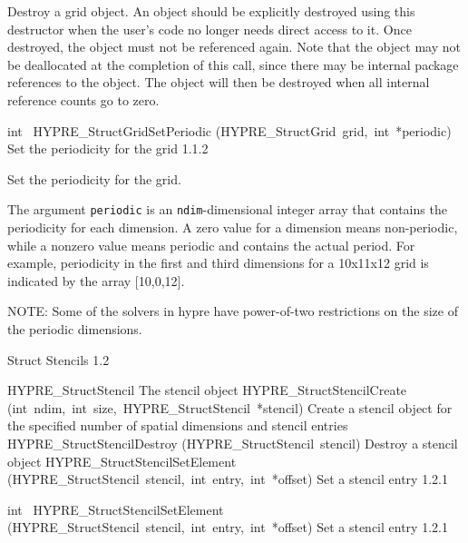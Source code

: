 \documentclass{article}
\begin{document}
\begin{cxxentry}
\begin{cxxentry}
\begin{cxxfunction}
\begin{cxxdoc}
Destroy a grid object.  An object should be explicitly destroyed using this
destructor when the user's code no longer needs direct access to it.  Once
destroyed, the object must not be referenced again.  Note that the object may
not be deallocated at the completion of this call, since there may be
internal package references to the object.  The object will then be destroyed
when all internal reference counts go to zero.
\end{cxxdoc}
\end{cxxfunction}
\begin{cxxfunction}
{int\ }
        {HYPRE\_StructGridSetPeriodic}
        {(HYPRE\_StructGrid\ grid,\ int\ *periodic)}
        {
Set the periodicity for the grid}
        {1.1.2}
\begin{cxxdoc}

Set the periodicity for the grid.

The argument {\tt periodic} is an {\tt ndim}-dimensional integer array that
contains the periodicity for each dimension.  A zero value for a dimension
means non-periodic, while a nonzero value means periodic and contains the
actual period.  For example, periodicity in the first and third dimensions
for a 10x11x12 grid is indicated by the array [10,0,12].

NOTE: Some of the solvers in hypre have power-of-two restrictions on the size
of the periodic dimensions.
\end{cxxdoc}
\end{cxxfunction}
\end{cxxentry}
\begin{cxxentry}
{}
        {Struct Stencils}
        {}
        {
}
        {1.2}
\begin{cxxnames}
        {HYPRE\_StructStencil}
        {}
        {
The stencil object}
        {}
\label{cxx.1.2.2}
        {HYPRE\_StructStencilCreate}
        {(int\ ndim,\ int\ size,\ HYPRE\_StructStencil\ *stencil)}
        {
Create a stencil object for the specified number of spatial dimensions and
stencil entries}
        {}
\label{cxx.1.2.3}
        {HYPRE\_StructStencilDestroy}
        {(HYPRE\_StructStencil\ stencil)}
        {
Destroy a stencil object}
        {}
\label{cxx.1.2.4}
        {HYPRE\_StructStencilSetElement}
        {(HYPRE\_StructStencil\ stencil,\ int\ entry,\ int\ *offset)}
        {
Set a stencil entry}
        {1.2.1}
\end{cxxnames}
\begin{cxxfunction}
{int\ }
        {HYPRE\_StructStencilSetElement}
        {(HYPRE\_StructStencil\ stencil,\ int\ entry,\ int\ *offset)}
        {
Set a stencil entry}
        {1.2.1}
\begin{cxxdoc}


\end{cxxdoc}
\end{cxxfunction}
\end{cxxentry}
\end{cxxentry}
\end{document}
